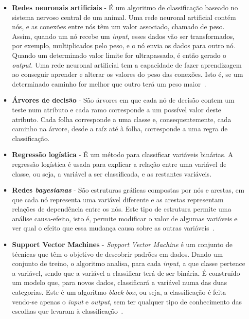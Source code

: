 \begin{itemize}
\item \textbf{Redes neuronais artificiais} - É um algoritmo de classificação baseado no sistema nervoso central de um animal. Uma rede neuronal artificial contém nós, e as conexões entre nós têm um valor associado, chamado de peso. Assim, quando um nó recebe um \textit{input}, esses dados vão ser transformados, por exemplo, multiplicados pelo peso, e o nó envia os dados para outro nó. Quando um determinado valor limite for ultrapassado, é então gerado o \textit{output}. Uma rede neuronal artificial tem a capacidade de fazer aprendizagem ao conseguir aprender e alterar os valores do peso das conexões. Isto é, se um determinado caminho for melhor que outro terá um peso maior~\cite{ann}.

\item \textbf{Árvores de decisão} - São árvores em que cada nó de decisão contem um teste num atributo e cada ramo corresponde a um possível valor deste atributo. Cada folha corresponde a uma classe e, consequentemente, cada caminho na árvore, desde a raíz até à folha, corresponde a uma regra de classificação. 

\item \textbf{Regressão logística} - É um método para classificar variáveis binárias. A regressão logística é usada para explicar a relação entre uma variável de classe, ou seja, a variável a ser classificada, e as restantes variáveis.\newline

\item \textbf{Redes \textit{bayesianas}} - São estruturas gráficas compostas por nós e arestas, em que cada nó representa uma variável diferente e as arestas representam relações de dependência entre os nós. Este tipo de estrutura permite uma análise causa-efeito, isto é, permite modificar o valor de algumas variáveis e ver qual o efeito que essa mudança causa sobre as outras variáveis~\cite{nets}.

\item \textbf{Support Vector Machines} - \textit{Support Vector Machine} é um conjunto de técnicas que têm o objetivo de descobrir padrões em dados. Dando um conjunto de treino, o algoritmo analisa, para cada \textit{input}, a que classe pertence a variável, sendo que a variável a classificar terá de ser binária. É construído um modelo que, para novos dados, classificará a variável numa das duas categorias. Este é um algoritmo \textit{black-box}, ou seja, a classificação é feita vendo-se apenas o \textit{input} e \textit{output}, sem ter qualquer tipo de conhecimento das escolhas que levaram à classificação~\cite{svmm}.
\end{itemize}

